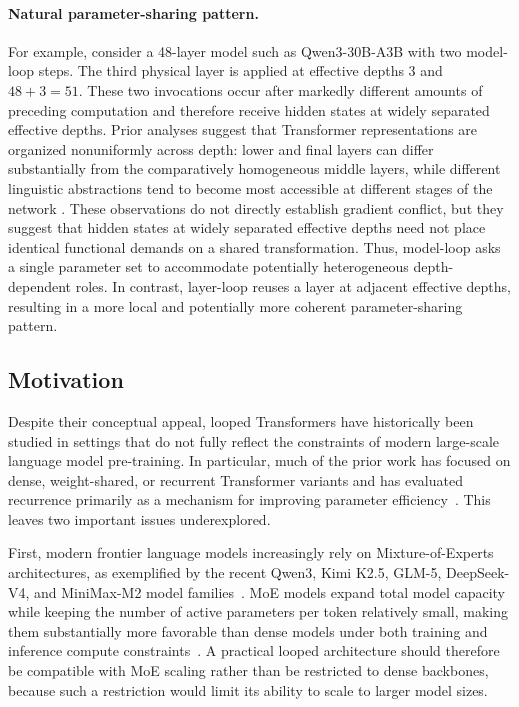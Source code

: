 \paragraph{Natural parameter-sharing pattern.}
For example, consider a 48-layer model such as Qwen3-30B-A3B with two model-loop steps. The third physical layer is applied at effective depths \(3\) and \(48 + 3 = 51\). These two invocations occur after markedly different amounts of preceding computation and therefore receive hidden states at widely separated effective depths. Prior analyses suggest that Transformer representations are organized nonuniformly across depth: lower and final layers can differ substantially from the comparatively homogeneous middle layers, while different linguistic abstractions tend to become most accessible at different stages of the network \citep{sun2025transformer,tenney2019bert,jawahar2019bert}. These observations do not directly establish gradient conflict, but they suggest that hidden states at widely separated effective depths need not place identical functional demands on a shared transformation. Thus, model-loop asks a single parameter set to accommodate potentially heterogeneous depth-dependent roles. In contrast, layer-loop reuses a layer at adjacent effective depths, resulting in a more local and potentially more coherent parameter-sharing pattern.

\subsection{Motivation}
\label{subsec:motivation}

Despite their conceptual appeal, looped Transformers have historically been studied in settings that do not fully reflect the constraints of modern large-scale language model pre-training. In particular, much of the prior work has focused on dense, weight-shared, or recurrent Transformer variants and has evaluated recurrence primarily as a mechanism for improving parameter efficiency~\citep{zhu2025scalinglatent,geiping2025scalinglatent}. This leaves two important issues underexplored.

First, modern frontier language models increasingly rely on Mixture-of-Experts architectures, as exemplified by the recent Qwen3, Kimi K2.5, GLM-5, DeepSeek-V4, and MiniMax-M2 model families~\citep{qwen3,kimi2026kimi25,glm5team2026glm5,deepseekai2026deepseekv4,minimax2026m2}. MoE models expand total model capacity while keeping the number of active parameters per token relatively small, making them substantially more favorable than dense models under both training and inference compute constraints~\citep{shazeer2017outrageously,fedus2022switch,du2022glam,abnar2025parameters}. A practical looped architecture should therefore be compatible with MoE scaling rather than be restricted to dense backbones, because such a restriction would limit its ability to scale to larger model sizes.

